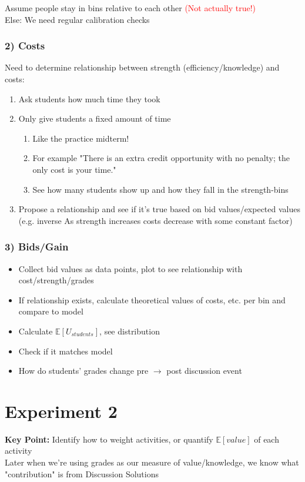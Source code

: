 \documentclass[leqno]{article}
\begin{document}
Assume people stay in bins relative to each other \textcolor{red}{(Not actually true!)}\\
Else: We need regular calibration checks

\subsubsection*{2) Costs}
Need to determine relationship between strength (efficiency/knowledge) and costs:
\begin{enumerate}
\item Ask students how much time they took
\item Only give students a fixed amount of time
\begin{enumerate}
\item Like the practice midterm!
\item For example "There is an extra credit opportunity with no penalty; the only cost is your time."
\item See how many students show up and how they fall in the strength-bins
\end{enumerate}
\item Propose a relationship and see if it's true based on bid values/expected values (e.g. inverse As strength increases costs decrease with some constant factor)
\end{enumerate}

\subsubsection*{3) Bids/Gain}
\begin{itemize}
\item Collect bid values as data points, plot to see relationship with cost/strength/grades
\item If relationship exists, calculate theoretical values of costs, etc. per bin and compare to model
\item Calculate $\mathbb{E} [U_{students}]$, see distribution
\item Check if it matches model
\item How do students' grades change pre $\rightarrow$ post discussion event
\end{itemize}

\section{Experiment 2}
\textbf{Key Point:} Identify how to weight activities, or quantify $\mathbb{E} [value]$ of each activity\\
Later when we're using grades as our measure of value/knowledge, we know what "contribution" is from Discussion Solutions
\end{document}
